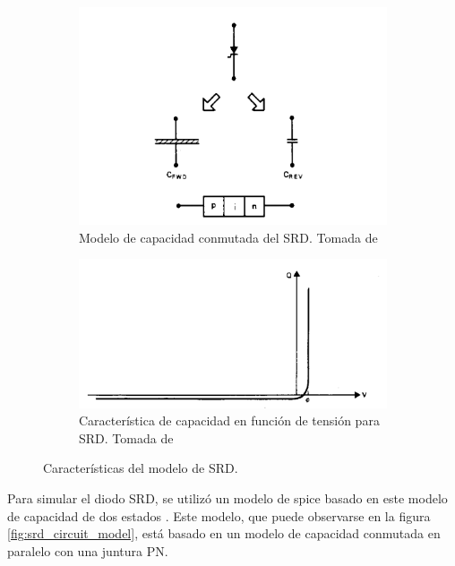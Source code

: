 \begin{figure}
    \centering
    \begin{subfigure}[b]{0.45\textwidth}
        \includegraphics[width=\textwidth]{images/srd_switched_model.jpg}
        \caption{Modelo de capacidad conmutada del SRD. Tomada de
        \cite{moll1969}}
        \label{fig:srd_switched_model}
    \end{subfigure}
    \hfill
    \begin{subfigure}[b]{0.45\textwidth}
        \includegraphics[width=\textwidth]{images/srd_capacity_vs_voltaje.jpg}
        \caption{Característica de capacidad en función de tensión para SRD.
        Tomada de \cite{moll1969}}
        \label{fig:srd_capacity_vs_voltaje}
    \end{subfigure}
    \caption{Características del modelo de SRD.}
    \label{fig:srd_model_characteristics}
\end{figure}

Para simular el diodo SRD, se utilizó un modelo de spice basado en este modelo
de capacidad de dos estados \cite{zhang1995} \cite{zhang1996}. Este modelo, que
puede observarse en la figura \ref{fig:srd_circuit_model}, está basado en un
modelo de capacidad conmutada en paralelo con una juntura PN.

